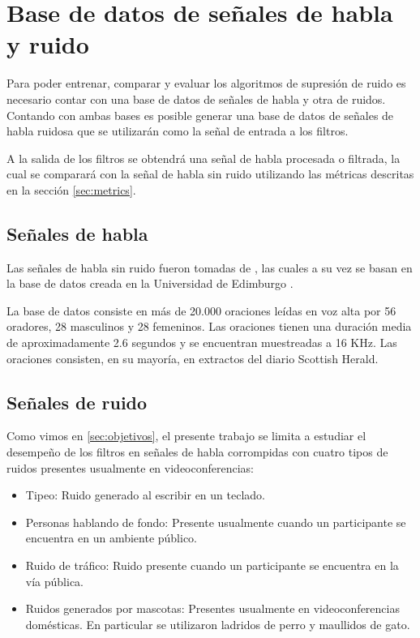 \section{Base de datos de señales de habla y ruido}
\label{sec:audio_db}

Para poder entrenar, comparar y evaluar los algoritmos de supresión de ruido es necesario contar con una base de datos de señales de habla y otra de ruidos. Contando con ambas bases es posible generar una base de datos de señales de habla ruidosa que se utilizarán como la señal de entrada a los filtros.

A la salida de los filtros se obtendrá una señal de habla procesada o filtrada, la cual se comparará con la señal de habla sin ruido utilizando las métricas descritas en la sección \ref{sec:metrics}.

\subsection{Señales de habla}

Las señales de habla sin ruido fueron tomadas de \cite{a_scalable_noisy_speech_dataset_and_online_subjective_test_framework}, las cuales a su vez se basan en la base de datos creada en la Universidad de Edimburgo \cite{the_voice_bank_corpus}. 

La base de datos consiste en más de 20.000 oraciones leídas en voz alta por 56 oradores, 28 masculinos y 28 femeninos. Las oraciones tienen una duración media de aproximadamente 2.6 segundos y se encuentran muestreadas a 16 KHz. Las oraciones consisten, en su mayoría, en extractos del diario Scottish Herald.

\subsection{Señales de ruido}

Como vimos en \ref{sec:objetivos}, el presente trabajo se limita a estudiar el desempeño de los filtros en señales de habla corrompidas con cuatro tipos de  ruidos presentes usualmente en videoconferencias:

\begin{itemize}
	\item Tipeo: Ruido generado al escribir en un teclado.
	\item Personas hablando de fondo: Presente usualmente cuando un participante se encuentra en un ambiente público.
	\item Ruido de tráfico: Ruido presente cuando un participante se encuentra en la vía pública.
	\item Ruidos generados por mascotas: Presentes usualmente en videoconferencias domésticas. En particular se utilizaron ladridos de perro y maullidos de gato.
\end{itemize}

